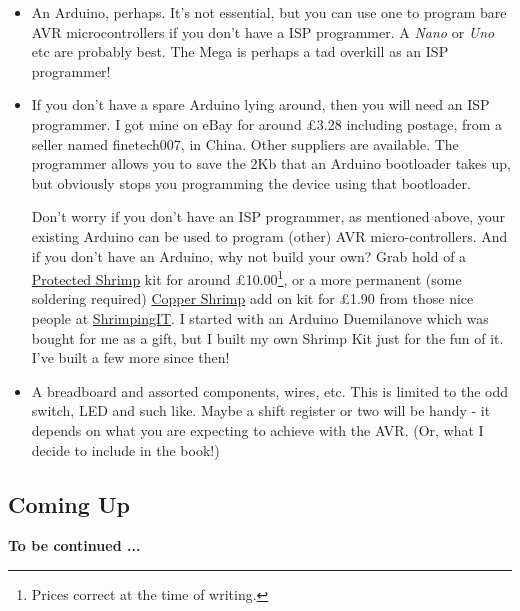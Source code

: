 \begin{itemize}
\item
  An Arduino, perhaps. It's not essential, but you can use one to
  program bare AVR microcontrollers if you don't have a ISP programmer.
  A \emph{Nano} or \emph{Uno} etc are probably best. The Mega is perhaps
  a tad overkill as an ISP programmer!
\item
  If you don't have a spare Arduino lying around, then you will need an
  ISP programmer. I got mine on eBay for around £3.28 including postage,
  from a seller named finetech007, in China. Other suppliers are
  available. The programmer allows you to save the 2Kb that an Arduino
  bootloader takes up, but obviously stops you programming the device
  using that bootloader.

  Don't worry if you don't have an ISP programmer, as mentioned above,
  your existing Arduino can be used to program (other) AVR
  micro-controllers. And if you don't have an Arduino, why not build
  your own? Grab hold of a
  \href{http://start.shrimping.it/project/protected/build.html}{Protected
  Shrimp} kit for around £10.00\footnote{Prices correct at the time of
    writing.}, or a more permanent (some soldering required)
  \href{http://start.shrimping.it/kit/stripboard.html}{Copper Shrimp}
  add on kit for £1.90 from those nice people at
  \href{http://start.shrimping.it//index.html}{ShrimpingIT}. I started
  with an Arduino Duemilanove which was bought for me as a gift, but I
  built my own Shrimp Kit just for the fun of it. I've built a few more
  since then!
\item
  A breadboard and assorted components, wires, etc. This is limited to
  the odd switch, LED and such like. Maybe a shift register or two will
  be handy - it depends on what you are expecting to achieve with the
  AVR. (Or, what I decide to include in the book!)
\end{itemize}

\subsection*{Coming Up}\label{coming-up}

\textbf{To be continued ...}
